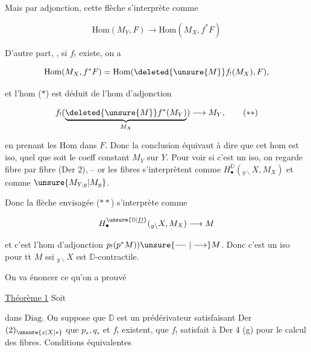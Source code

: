 
Mais par adjonction, cette flèche s'interprète comme

\[ \mathrm{Hom}(M_Y,F)\longrightarrow\mathrm{Hom}(M_X,f^*F)\tag*{($*$)} \]

D'autre part, , si $f_!$ existe, on a

\[ \mathrm{Hom}(M_X,f^*F)=\mathrm{Hom}(\deleted{\unsure{M}}f_!(M_X),F), \]

et l'hom ($*$) est déduit de l'hom d'adjonction

\[ f_!(\underbrace{\deleted{\unsure{M}}f^*(M_Y)}_{M_X})\longrightarrow M_Y,\tag*{($**$)} \]

en prenant les Hom dans $F$. Donc la conclusion équivaut à dire que cet hom est iso, quel que soit  le  coeff constant $M_Y$ sur $Y$. Pour voir si c'est un iso, on regarde fibre par fibre (Der 2), -- or les fibres s'interprètent comme $H_\bullet^{\mathbb D}({}_{y\backslash}X,M_X)$  et comme $\unsure{M_{Y,y}|M_y}$.

Donc la flèche envisagée ($**$) s'interprète comme

\[ H_\bullet^{\unsure{\mathbb D|\underline D}}({}_{y\backslash}X,M_X)\longrightarrow M \]

et c'est l'hom d'adjonction $p_!(p^*M))\unsure{\relbar\joinrel\relbar|\longrightarrow}M$. Donc c'est un iso pour tt $M$ ssi $ {}_{y\backslash}X$ est  $\mathbb D$-contractile.

On va  énoncer ce qu'on a prouvé

\uline{Théorème 1} Soit


dans $\mathrm{Diag}$. On suppose que $\mathbb D$ est un  prédérivateur satisfaisant Der $(2)_{\unsure{x|X|*}}$  que  $p_*,q_*$ et $f_!$ existent, que $f_!$ satisfait à Der 4 (g) pour le calcul des fibres. Conditions équivalentes

